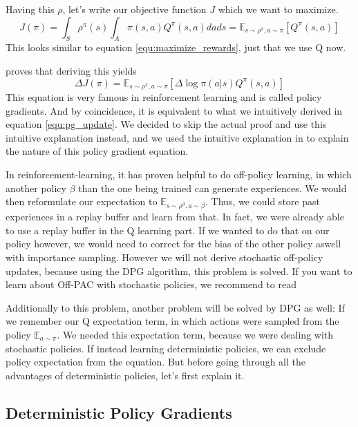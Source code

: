 \documentclass[hyperref,german,beleg]{cgvpub}
\begin{document}
Having this $\rho$, let's write our objective function $J$ which we want to maximize.
\begin{equation}
J(\pi) = \int_S \rho^{\pi}(s) \int_A \pi(s, a)Q^{\pi}(s, a) dads = \mathbb{E}_{s \sim \rho^{\pi}, a \sim \pi}[Q^{\pi}(s,a)]
\end{equation}
This looks similar to equation \ref{equ:maximize_rewards}, just that we use Q now.


\cite{suttonPolicyGradientMethods} proves that deriving this yields
\begin{equation}
\Delta J(\pi) = \mathbb{E}_{s \sim \rho^{\pi}, a \sim \pi}[\Delta \log \pi(a|s)Q^{\pi}(s, a)]
\label{equ:pg}
\end{equation}
This equation is very famous in reinforcement learning and is called policy gradients. And by coincidence, it is equivalent to what we intuitively derived in equation \ref{equ:pg_update}. We decided to skip the actual proof and use this intuitive explanation instead, and we used the intuitive explanation in \cite[Chapter 13, Section 3, after Equation 13.8]{suttonReinforcementLearningIntroduction2018} to explain the nature of this policy gradient equation.


In reinforcement-learning, it has proven helpful to do off-policy learning, in which another policy $\beta$ than the one being trained can generate experiences. We would then reformulate our expectation to $\mathbb{E}_{s \sim \rho^{\beta}, a \sim \beta}$. Thus, we could store past experiences in a replay buffer and learn from that. In fact, we were already able to use a replay buffer in the Q learning part. If we wanted to do that on our policy however, we would need to correct for the bias of the other policy aswell with importance sampling. However we will not derive stochastic off-policy updates, because using the \ac{DPG} algorithm, this problem is solved. If you want to learn about \ac{Off-PAC} with stochastic policies, we recommend to read \cite{degrisOffPolicyActorCritic2013}

Additionally to this problem, another problem will be solved by \ac{DPG} as well: If we remember our Q expectation term, in which actions were sampled from the policy $\mathbb{E}_{a \sim \pi}$. We needed this expectation term, because we were dealing with stochastic policies. If instead learning deterministic policies, we can exclude policy expectation from the equation. But before going through all the advantages of deterministic policies, let's first explain it.

\subsection{Deterministic Policy Gradients}
\end{document}
